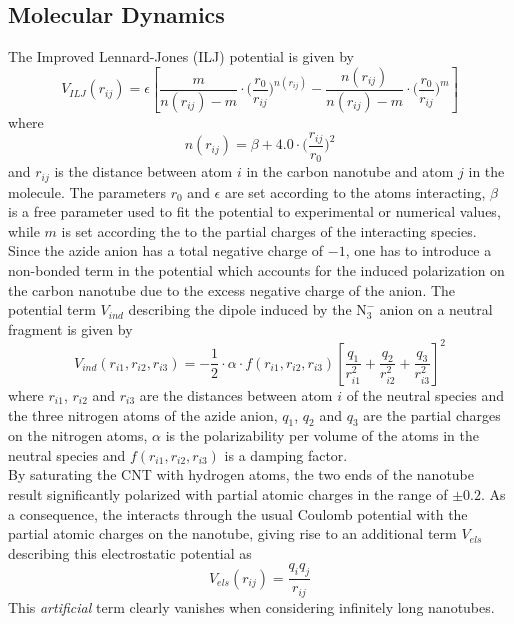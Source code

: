 \documentclass[utf8]{article}
\begin{document}
\subsection{Molecular Dynamics}
The Improved Lennard-Jones (ILJ) potential\cite{Pirani2008} is given by
%
\begin{equation}
    V_{ILJ}(r_{ij}) = \epsilon \left[ \frac{m}{n(r_{ij})-m} \cdot \Big( \frac{r_0}{r_{ij}} \Big)^{n(r_{ij})} -
                                 \frac{n(r_{ij})}{n(r_{ij})-m} \cdot \Big( \frac{r_0}{r_{ij}} \Big)^{m} \right]
\end{equation}
%
where
%
\begin{equation}
    n(r_{ij}) = \beta + 4.0 \cdot \Big( \frac{r_{ij}}{r_0} \Big)^2
\end{equation}
%
and $r_{ij}$ is the distance between atom $i$ in the carbon nanotube and atom $j$ in the \ntm molecule. The parameters $r_0$ and $\epsilon$ are set according to the atoms interacting, $\beta$ is a free parameter used to fit the potential to experimental or numerical values, while $m$ is set according the to the partial charges of the interacting species.
Since the azide anion has a total negative charge of $-1$, one has to introduce a non-bonded term in the potential which accounts for the induced polarization on the carbon nanotube due to the excess negative charge of the anion.
The potential term $V_{ind}$ describing the dipole induced by the $\text{N}_3^-$ anion on a neutral fragment is given by
%
\begin{equation}
    V_{ind}(r_{i1},r_{i2},r_{i3}) = - \frac{1}{2} \cdot \alpha \cdot f(r_{i1},r_{i2},r_{i3})
                        \left[ \frac{q_1}{r_{i1}^2} + \frac{q_2}{r_{i2}^2} + \frac{q_3}{r_{i3}^2} \right]^2
\end{equation}
%
where $r_{i1}$, $r_{i2}$ and $r_{i3}$ are the distances between atom $i$ of the neutral species and the three nitrogen atoms of the azide anion, $q_1$, $q_2$ and $q_3$ are the partial charges on the nitrogen atoms, $\alpha$ is the polarizability per volume of the atoms in the neutral species and $f(r_{i1},r_{i2},r_{i3})$ is a damping factor.\\  %
By saturating the CNT with hydrogen atoms, the two ends of the nanotube result significantly polarized with partial atomic charges in the range of $\pm 0.2$.
As a consequence, the \ntm interacts through the usual Coulomb potential with the partial atomic charges on the nanotube, giving rise to an additional term $V_{els}$ describing this electrostatic potential as
%
\begin{equation}
    V_{els}(r_{ij}) = \frac{q_i q_j}{r_{ij}}
\end{equation}
%
This \textit{artificial} term clearly vanishes when considering infinitely long nanotubes.\\
\end{document}
